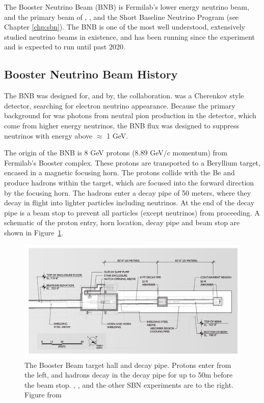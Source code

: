 The Booster Neutrino Beam (BNB) is Fermilab's lower energy neutrino beam, and the primary beam of \MB, \uboone, and the Short Baseline Neutrino Program (see Chapter \ref{chp:sbn}).  The BNB is one of the most well understood, extensively studied neutrino beams in existence, and has been running since the \MB experiment and is expected to run until past 2020.

\subsection{Booster Neutrino Beam History}
The BNB was designed for, and by, the \MB collaboration.  \MB was a Cherenkov style detector, searching for electron neutrino appearance.  Because the primary background for \MB was photons from neutral pion production in the detector, which come from higher energy neutrinos, the BNB flux was designed to suppress neutrinos with energy above $\approx$ 1 GeV.

The origin of the BNB is 8 GeV protons (8.89 GeV/c momentum) from Fermilab's Booster complex.  These protons are transported to a Beryllium target, encased in a magnetic focusing horn.  The protons collide with the Be and produce hadrons within the target, which are focused into the forward direction by the focusing horn.  The hadrons enter a decay pipe of 50 meters, where they decay in flight into lighter particles including neutrinos.  At the end of the decay pipe is a beam stop to prevent all particles (except neutrinos) from proceeding.  A schematic of the proton entry, horn location, decay pipe and beam stop are shown in Figure~\ref{fig:mb_target_schematic}.

\begin{figure}[tb]
  \centering
  \includegraphics[width=\textwidth]{beams_figures/mb_target_schematic}
  \caption[BNB Target Schematic]{The Booster Beam target hall and decay pipe.  Protons enter from the left, and hadrons decay in the decay pipe for up to 50m before the beam stop.  \MB, \uboone, and the other SBN experiments are to the right. Figure from \cite{AguilarArevalo:2008yp}}
  \label{fig:mb_target_schematic}
\end{figure}

